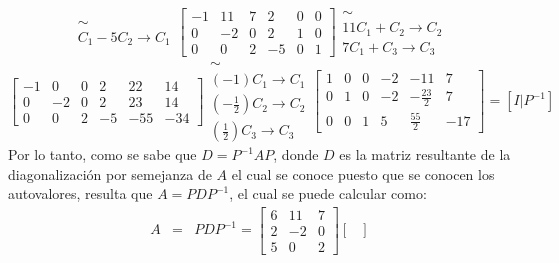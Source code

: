 \begin{solucion}
\begin{enumerate}[$a$)]
\begin{equation*}
\begin{matrix}
    \sim \\
    C_1 - 5C_2 \rightarrow C_1
   \end{matrix}
   \left[
   \begin{array}{ccc|ccc}
    -1 & 11 & 7 &  2 & 0 & 0 \\
     0 & -2 & 0 &  2 & 1 & 0 \\
     0 &  0 & 2 & -5 & 0 & 1 
   \end{array}
   \right]
   \begin{matrix}
    \sim \\
    11C_1 + C_2 \rightarrow C_2 \\
    7C_1 + C_3 \rightarrow C_3 
   \end{matrix}
  \end{equation*}
  \begin{equation*}
   \left[
   \begin{array}{ccc|ccc}
    -1 &  0 & 0 &  2 &  22 &  14 \\
     0 & -2 & 0 &  2 &  23 &  14 \\
     0 &  0 & 2 & -5 & -55 & -34 
   \end{array}
   \right]
   \begin{matrix}
    \sim \\
    (-1)C_1 \rightarrow C_1 \\
    \left(-\frac{1}{2}\right)C_2 \rightarrow C_2 \\
    \left(\frac{1}{2} \right) C_3 \rightarrow C_3 
   \end{matrix}
   \left[
   \begin{array}{ccc|ccc}
    1 & 0 & 0 & -2 & -11 & 7 \\
    0 & 1 & 0 & -2 & -\frac{23}{2} &  7 \\
    0 & 0 & 1 &  5 & \frac{55}{2} & -17 
   \end{array}
   \right]
   = \left[I|P^{-1}\right]
  \end{equation*}
  Por lo tanto, como se sabe que $D = P^{-1}AP$, donde $D$ es la matriz resultante de la diagonalizaci\'on por semejanza de $A$ el cual se conoce puesto que se conocen los autovalores, resulta que $A = PDP^{-1}$, el cual se puede calcular como:
  \begin{eqnarray*}
   A & = & PDP^{-1} =
   \begin{bmatrix}
    6 & 11 & 7 \\
    2 & -2 & 0 \\
    5 &  0 & 2
   \end{bmatrix}
   \begin{bmatrix}

\end{bmatrix}
\end{eqnarray*}
\end{enumerate}
\end{solucion}
